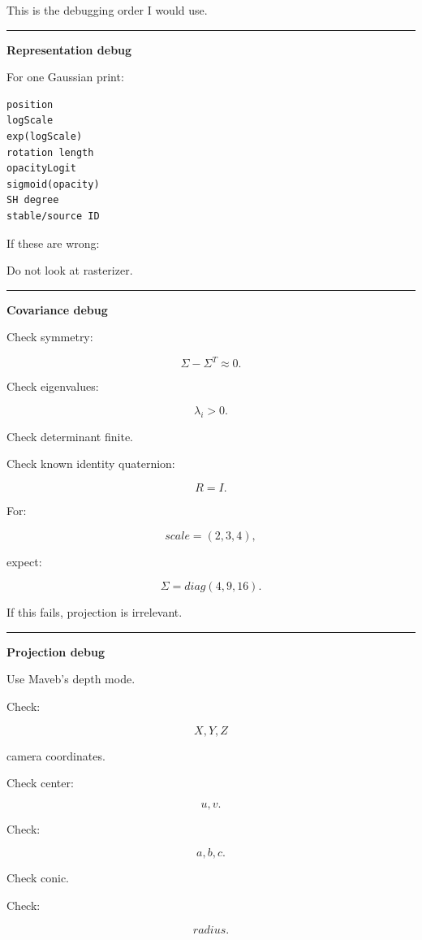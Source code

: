 This is the debugging order I would use.

\begin{center}\rule{0.5\linewidth}{0.5pt}\end{center}

\textbf{Representation debug}

For one Gaussian print:

\protect{}\label{fn1jmm}%
\begin{verbatim}
position
logScale
exp(logScale)
rotation length
opacityLogit
sigmoid(opacity)
SH degree
stable/source ID
\end{verbatim}

If these are wrong:

Do not look at rasterizer.

\begin{center}\rule{0.5\linewidth}{0.5pt}\end{center}

\textbf{Covariance debug}

Check symmetry:

\[
\Sigma-\Sigma^T\approx0.
\]

Check eigenvalues:

\[
\lambda_i>0.
\]

Check determinant finite.

Check known identity quaternion:

\[
R=I.
\]

For:

\[
scale=(2,3,4),
\]

expect:

\[
\Sigma=
diag(4,9,16).
\]

If this fails, projection is irrelevant.

\begin{center}\rule{0.5\linewidth}{0.5pt}\end{center}

\textbf{Projection debug}

Use Maveb's depth mode.

Check:

\[
X,Y,Z
\]

camera coordinates.

Check center:

\[
u,v.
\]

Check:

\[
a,b,c.
\]

Check conic.

Check:

\[
radius.
\]

